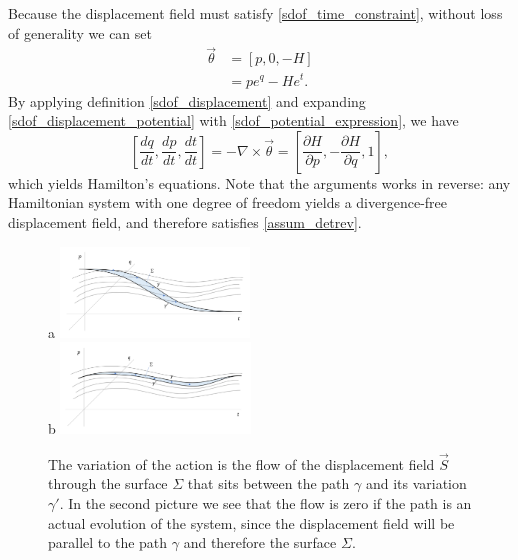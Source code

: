 \documentclass[10pt,twocolumn, nofootinbib]{revtex4-2}
\begin{document}
Because the displacement field must satisfy \ref{sdof_time_constraint}, without loss of generality we can set
\begin{equation}\label{sdof_potential_expression}
\begin{aligned}
	\vec{\theta} &= [p, 0, -H] \\
	&= p e^q - H e^t.
\end{aligned}
\end{equation}
By applying definition \ref{sdof_displacement} and expanding \ref{sdof_displacement_potential} with \ref{sdof_potential_expression}, we have
\begin{equation}\label{sdof_Ham_eq}
	\left[ \frac{dq}{dt},\frac{dp}{dt},\frac{dt}{dt} \right] = - \nabla \times \vec{\theta} = \left[ \frac{\partial H}{\partial p},-\frac{\partial H}{\partial q}, 1 \right],
\end{equation}
which yields Hamilton's equations. Note that the arguments works in reverse: any Hamiltonian system with one degree of freedom yields a divergence-free displacement field, and therefore satisfies \ref{assum_detrev}.

\begin{figure}
	a \includegraphics[width = 0.45\textwidth]{ActionNonOptimized.png} \\
	b \includegraphics[width = 0.45\textwidth]{ActionOptimized.png}
	\caption{\footnotesize{The variation of the action is the flow of the displacement field $\vec{S}$ through the surface $\Sigma$ that sits between the path $\gamma$ and its variation $\gamma'$. In the second picture we see that the flow is zero if the path is an actual evolution of the system, since the displacement field will be parallel to the path $\gamma$ and therefore the surface $\Sigma$.}}\label{fig_action}
\end{figure}
\end{document}
